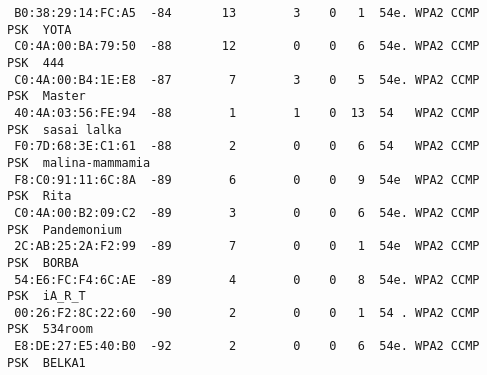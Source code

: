 \documentclass[10pt,a4paper]{article}
\begin{document}
\begin{itemize}
\begin{lstlisting}
 B0:38:29:14:FC:A5  -84       13        3    0   1  54e. WPA2 CCMP   PSK  YOTA                                                                                                                                                               
 C0:4A:00:BA:79:50  -88       12        0    0   6  54e. WPA2 CCMP   PSK  444                                                                                                                                                                
 C0:4A:00:B4:1E:E8  -87        7        3    0   5  54e. WPA2 CCMP   PSK  Master                                                                                                                                                             
 40:4A:03:56:FE:94  -88        1        1    0  13  54   WPA2 CCMP   PSK  sasai lalka                                                                                                                                                        
 F0:7D:68:3E:C1:61  -88        2        0    0   6  54   WPA2 CCMP   PSK  malina-mammamia                                                                                                                                                    
 F8:C0:91:11:6C:8A  -89        6        0    0   9  54e  WPA2 CCMP   PSK  Rita                                                                                                                                                               
 C0:4A:00:B2:09:C2  -89        3        0    0   6  54e. WPA2 CCMP   PSK  Pandemonium                                                                                                                                                        
 2C:AB:25:2A:F2:99  -89        7        0    0   1  54e  WPA2 CCMP   PSK  BORBA                                                                                                                                                              
 54:E6:FC:F4:6C:AE  -89        4        0    0   8  54e. WPA2 CCMP   PSK  iA_R_T                                                                                                                                                             
 00:26:F2:8C:22:60  -90        2        0    0   1  54 . WPA2 CCMP   PSK  534room                                                                                                                                                            
 E8:DE:27:E5:40:B0  -92        2        0    0   6  54e. WPA2 CCMP   PSK  BELKA1                                                                                                                                                             
                                                                                                                                                                                                                                             

\end{lstlisting}
\end{itemize}
\end{document}
